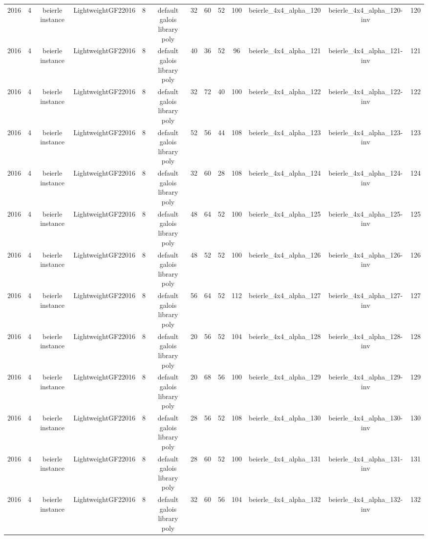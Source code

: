 \begin{tabular}{c c c c c c c c c c c c c}
2016 & 4 & beierle instance & LightweightGF22016 & 8 & default galois library poly & 32 & 60 & 52 & 100 & beierle_4x4_alpha_120 & beierle_4x4_alpha_120-inv & 120 \\
2016 & 4 & beierle instance & LightweightGF22016 & 8 & default galois library poly & 40 & 36 & 52 & 96 & beierle_4x4_alpha_121 & beierle_4x4_alpha_121-inv & 121 \\
2016 & 4 & beierle instance & LightweightGF22016 & 8 & default galois library poly & 32 & 72 & 40 & 100 & beierle_4x4_alpha_122 & beierle_4x4_alpha_122-inv & 122 \\
2016 & 4 & beierle instance & LightweightGF22016 & 8 & default galois library poly & 52 & 56 & 44 & 108 & beierle_4x4_alpha_123 & beierle_4x4_alpha_123-inv & 123 \\
2016 & 4 & beierle instance & LightweightGF22016 & 8 & default galois library poly & 32 & 60 & 28 & 108 & beierle_4x4_alpha_124 & beierle_4x4_alpha_124-inv & 124 \\
2016 & 4 & beierle instance & LightweightGF22016 & 8 & default galois library poly & 48 & 64 & 52 & 100 & beierle_4x4_alpha_125 & beierle_4x4_alpha_125-inv & 125 \\
2016 & 4 & beierle instance & LightweightGF22016 & 8 & default galois library poly & 48 & 52 & 52 & 100 & beierle_4x4_alpha_126 & beierle_4x4_alpha_126-inv & 126 \\
2016 & 4 & beierle instance & LightweightGF22016 & 8 & default galois library poly & 56 & 64 & 52 & 112 & beierle_4x4_alpha_127 & beierle_4x4_alpha_127-inv & 127 \\
2016 & 4 & beierle instance & LightweightGF22016 & 8 & default galois library poly & 20 & 56 & 52 & 104 & beierle_4x4_alpha_128 & beierle_4x4_alpha_128-inv & 128 \\
2016 & 4 & beierle instance & LightweightGF22016 & 8 & default galois library poly & 20 & 68 & 56 & 100 & beierle_4x4_alpha_129 & beierle_4x4_alpha_129-inv & 129 \\
2016 & 4 & beierle instance & LightweightGF22016 & 8 & default galois library poly & 28 & 56 & 52 & 108 & beierle_4x4_alpha_130 & beierle_4x4_alpha_130-inv & 130 \\
2016 & 4 & beierle instance & LightweightGF22016 & 8 & default galois library poly & 28 & 60 & 52 & 100 & beierle_4x4_alpha_131 & beierle_4x4_alpha_131-inv & 131 \\
2016 & 4 & beierle instance & LightweightGF22016 & 8 & default galois library poly & 32 & 60 & 56 & 104 & beierle_4x4_alpha_132 & beierle_4x4_alpha_132-inv & 132 \\

\end{tabular}
